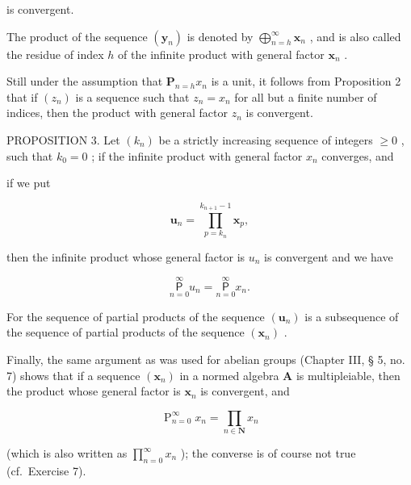 is convergent.

The product of the sequence \((\mathbf{y}_n)\) is denoted by \(\bigoplus_{n = h}^{\infty}\mathbf{x}_n\) , and is also called the residue of index \(h\) of the infinite product with general factor \(\mathbf{x}_n\) .

Still under the assumption that \(\mathbf{P}_{n=h} x_n\) is a unit, it follows from Proposition 2 that if \((z_n)\) is a sequence such that \(z_n = x_n\) for all but a finite number of indices, then the product with general factor \(z_n\) is convergent.

PROPOSITION 3. Let \((k_{n})\) be a strictly increasing sequence of integers \(\geqslant 0\) , such that \(k_{0} = 0\) ; if the infinite product with general factor \(x_{n}\) converges, and

if we put

\[
\boldsymbol {u} _ {n} = \prod_ {p = k _ {n}} ^ {k _ {n + 1} - 1} \boldsymbol {x} _ {p},
\]

then the infinite product whose general factor is \(u_{n}\) is convergent and we have

\[
\underset {n = 0} {\overset {\infty} {\mathsf {P}}} u _ {n} = \underset {n = 0} {\overset {\infty} {\mathsf {P}}} x _ {n}.
\]

For the sequence of partial products of the sequence \((\boldsymbol{u}_{n})\) is a subsequence of the sequence of partial products of the sequence \((\boldsymbol{x}_{n})\) .

Finally, the same argument as was used for abelian groups (Chapter III, § 5, no. 7) shows that if a sequence \((\pmb{x}_n)\) in a normed algebra \(\mathbf{A}\) is multipleiable, then the product whose general factor is \(\pmb{x}_n\) is convergent, and

\[
\mathop {\text { P }} _ {n = 0} ^ {\infty} x _ {n} = \prod_ {n \in \mathbf {N}} x _ {n}
\]

(which is also written as \(\prod_{n=0}^{\infty} x_n\) ); the converse is of course not true (cf.~Exercise 7).
\relax{}
\ExerciseGroupsStart
